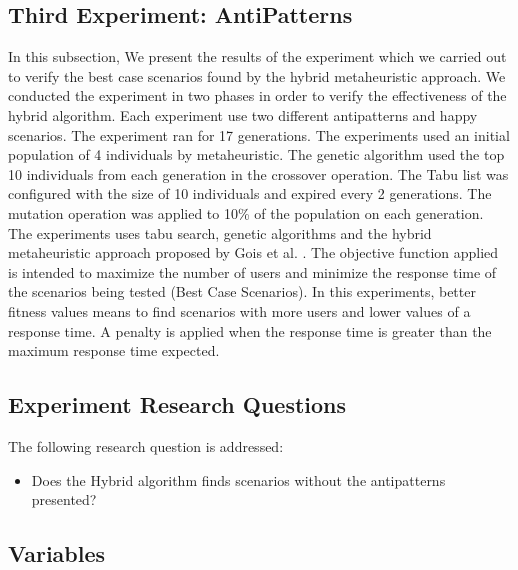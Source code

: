 \documentclass[espaco=umemeio,chapter=TITLE,twoside,openright]{abnt}
\begin{document}

\subsection{Third Experiment: AntiPatterns}

In this subsection, We present the results of the experiment which we carried out to verify the best case scenarios found by the hybrid metaheuristic approach. We conducted the experiment in two phases in order to verify the effectiveness of the hybrid algorithm. Each experiment use two different antipatterns and happy scenarios. The experiment ran for 17 generations. The experiments used an initial population of 4 individuals by metaheuristic. The genetic algorithm used the top 10 individuals from each generation in the crossover operation. The Tabu list was configured with the size of 10 individuals and expired every 2 generations.  The mutation operation was applied to 10\% of the population on each generation. The experiments uses tabu search, genetic algorithms and the hybrid metaheuristic approach proposed by Gois et al. \cite{Gois2016}. The objective function applied is intended to maximize the number of users and minimize the response time of the scenarios being tested (Best Case Scenarios).  In this experiments, better fitness values means to find scenarios with more users and lower values of a response time. A penalty is applied when the response time is greater than the  maximum response time expected.

\subsection{Experiment Research Questions}

The following research question is addressed:
\begin{itemize}
\item Does the Hybrid algorithm  finds scenarios without the antipatterns presented?
\end{itemize}

\subsection{Variables}
\end{document}
